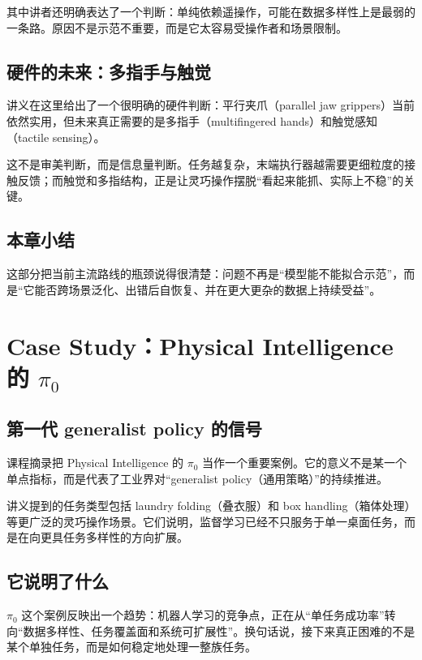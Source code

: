 \documentclass[a4paper]{article}
\begin{document}
其中讲者还明确表达了一个判断：单纯依赖遥操作，可能在数据多样性上是最弱的一条路。原因不是示范不重要，而是它太容易受操作者和场景限制。

\subsection{硬件的未来：多指手与触觉}

讲义在这里给出了一个很明确的硬件判断：平行夹爪（parallel jaw grippers）当前依然实用，但未来真正需要的是多指手（multifingered hands）和触觉感知（tactile sensing）。

这不是审美判断，而是信息量判断。任务越复杂，末端执行器越需要更细粒度的接触反馈；而触觉和多指结构，正是让灵巧操作摆脱“看起来能抓、实际上不稳”的关键。

\subsection{本章小结}

这部分把当前主流路线的瓶颈说得很清楚：问题不再是“模型能不能拟合示范”，而是“它能否跨场景泛化、出错后自恢复、并在更大更杂的数据上持续受益”。

\section{Case Study：Physical Intelligence 的 \texorpdfstring{$\pi_0$}{pi0}}

\subsection{第一代 generalist policy 的信号}

课程摘录把 Physical Intelligence 的 \(\pi_0\) 当作一个重要案例。它的意义不是某一个单点指标，而是代表了工业界对“generalist policy（通用策略）”的持续推进。

讲义提到的任务类型包括 laundry folding（叠衣服）和 box handling（箱体处理）等更广泛的灵巧操作场景。它们说明，监督学习已经不只服务于单一桌面任务，而是在向更具任务多样性的方向扩展。

\subsection{它说明了什么}

\(\pi_0\) 这个案例反映出一个趋势：机器人学习的竞争点，正在从“单任务成功率”转向“数据多样性、任务覆盖面和系统可扩展性”。换句话说，接下来真正困难的不是某个单独任务，而是如何稳定地处理一整族任务。
\end{document}
